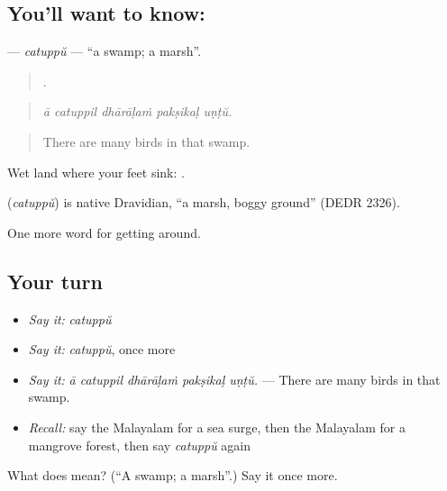 \subsection*{You'll want to know: }
\textbf{} — \emph{catuppŭ} — \textquotedblleft{}a swamp; a marsh\textquotedblright{}.

\begin{quote}
    .
\end{quote}

\begin{quote}
\emph{ā catuppil dhārāḷaṁ pakṣikaḷ uṇṭŭ.}
\end{quote}

\begin{quote}
There are many birds in that swamp.
\end{quote}

Wet land where your feet sink: .

\begin{cousinweb}
\textbf{} (\emph{catuppŭ}) is native Dravidian, \textquotedblleft{}a marsh, boggy ground\textquotedblright{} (DEDR 2326).
\end{cousinweb}

\begin{grammarlens}[title={What you've built}]
One more word for getting around.
\end{grammarlens}

\subsection*{Your turn}
\begin{itemize}
\raggedright
  \item \emph{Say it:} \emph{catuppŭ}
  \item \emph{Say it:} \emph{catuppŭ}, once more
  \item \emph{Say it:} \emph{ā catuppil dhārāḷaṁ pakṣikaḷ uṇṭŭ.} — There are many birds in that swamp.
  \item \emph{Recall:} say the Malayalam for a sea surge, then the Malayalam for a mangrove forest, then say \emph{catuppŭ} again
\end{itemize}

\begin{tcolorbox}[breakable,colback=teal!4,colframe=teal!35!black,title={Before you move on}]
What does  mean? (\textquotedblleft{}A swamp; a marsh\textquotedblright{}.) Say it once more.
\end{tcolorbox}
